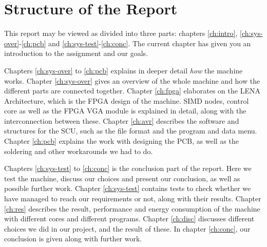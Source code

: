 \section{Structure of the Report}

This report may be viewed as divided into three parts: chapters
\ref{ch:intro}, \ref{ch:sys-over}-\ref{ch:pcb} and
\ref{ch:sys-test}-\ref{ch:conc}. The
current chapter has given you an introduction to the assignment and our goals.

Chapters \ref{ch:sys-over} to \ref{ch:pcb} explains in deeper detail {\em how}
the machine works. Chapter \ref{ch:sys-over} gives an overview of the whole
machine and how the different parts are connected together. Chapter
\ref{ch:fpga} elaborates on the \ac{LENA} Architecture, which is the \ac{FPGA}
design of the machine. \ac{SIMD} nodes, control core as well as the \ac{FPGA}
\ac{VGA} module is explained in detail, along with the interconnection between
these. Chapter \ref{ch:avr} describes the software and structures for the \ac{SCU},
such as the file format and the program and data menu. Chapter \ref{ch:pcb}
explains the work with designing the \ac{PCB}, as well as the soldering and
other workarounds we had to do.

Chapters \ref{ch:sys-test} to \ref{ch:conc} is the conclusion part of the
report. Here we test the machine, discuss our choices and present our
conclusion, as well as possible further work. Chapter \ref{ch:sys-test} contains
tests to check whether we have managed to reach our requirements or not, along
with their results. Chapter \ref{ch:res} describes the result, performance and
energy consumption of the machine with different cores and different
programs. Chapter \ref{ch:disc} discusses different choices we did in our
project, and the result of these. In chapter \ref{ch:conc}, our conclusion is
given along with further work.
